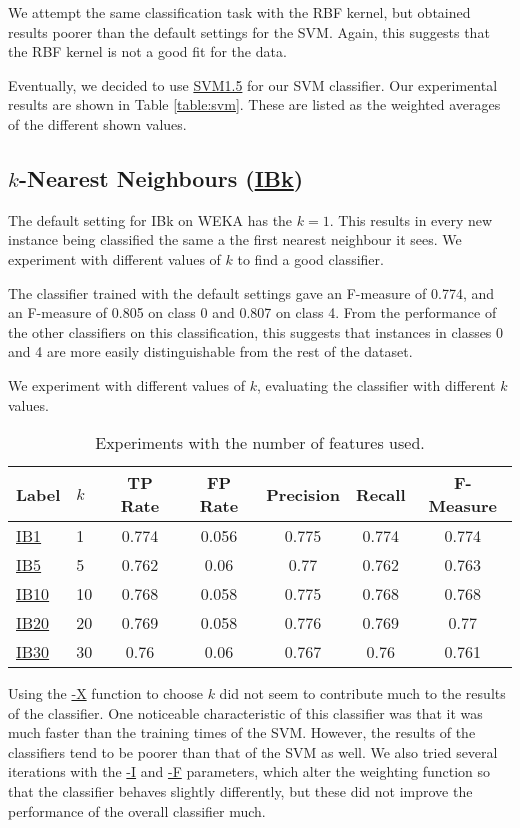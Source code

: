 \documentclass[12pt]{article}
\begin{document}
We attempt the same classification task with the RBF kernel, but obtained results poorer than the default settings for the SVM. Again, this suggests that the RBF kernel is not a good fit for the data.

Eventually, we decided to use \url{SVM1.5} for our SVM classifier. Our experimental results are shown in Table \ref{table:svm}. These are listed as the weighted averages of the different shown values.
\subsection{$k$-Nearest Neighbours (\url{IBk})}
The default setting for IBk on WEKA has the $k=1$. This results in every new instance being classified the same a the first nearest neighbour it sees. We experiment with different values of $k$ to find a good classifier.

The classifier trained with the default settings gave an F-measure of 0.774, and an F-measure of 0.805 on class 0 and 0.807 on class 4. From the performance of the other classifiers on this classification, this suggests that instances in classes 0 and 4 are more easily distinguishable from the rest of the dataset.

We experiment with different values of $k$, evaluating the classifier with different $k$ values.
\begin{table}[h]
\centering
\begin{tabular}{|l |l|c c c c c|}
\hline
Label & $k$ &	TP Rate & FP Rate & Precision & Recall  & F-Measure	 \\
\hline
\url{IB1}	& 1		&0.774    &  0.056   &    0.775  &    0.774   &   0.774	  \\
\url{IB5}	& 5 	&0.762    &  0.06    &    0.77   &    0.762   &   0.763	  \\   
\url{IB10}  & 10	&0.768    &  0.058   &    0.775  &    0.768   &   0.768	  \\
\url{IB20}	& 20	&0.769    &  0.058   &    0.776  &    0.769   &   0.77 	  \\
\url{IB30}	& 30	&0.76     &  0.06    &    0.767  &    0.76    &   0.761	  \\

\hline
\end{tabular}
\caption{Experiments with the number of features used.}
\label{table:knn}
\end{table}

Using the \url{-X} function to choose $k$ did not seem to contribute much to the results of the classifier. One noticeable characteristic of this classifier was that it was much faster than the training times of the SVM. However, the results of the classifiers tend to be poorer than that of the SVM as well. We also tried several iterations with the \url{-I} and \url{-F} parameters, which alter the weighting function so that the classifier behaves slightly differently, but these did not improve the performance of the overall classifier much.
\end{document}
